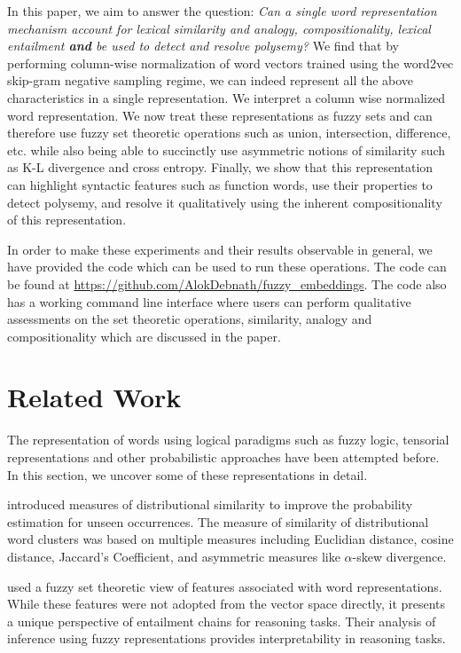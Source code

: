 \documentclass[11pt]{book}
\newcommand{\citet}[1]{\cite{#1}}
\begin{document}
In this paper, we aim to answer the question: \textit{Can a single word
representation mechanism account for lexical similarity and analogy,
compositionality, lexical entailment \textbf{and} be used to detect and resolve
polysemy?} We find that by performing column-wise normalization of word vectors
trained using the word2vec skip-gram negative sampling regime, we can indeed
represent all the above characteristics in a single representation. We
interpret a column wise normalized word representation. We now treat these
representations as fuzzy sets and can therefore use fuzzy set theoretic
operations such as union, intersection, difference, etc. while also being able
to succinctly use asymmetric notions of similarity such as K-L divergence and
cross entropy. Finally, we show that this representation can highlight
syntactic features such as function words, use their properties to detect
polysemy, and resolve it qualitatively using the inherent compositionality of
this representation.

In order to make these experiments and their results observable in general, we
have provided the code which can be used to run these operations. The code can
be found at \url{https://github.com/AlokDebnath/fuzzy_embeddings}. The code
also has a working command line interface where users can perform qualitative
assessments on the set theoretic operations, similarity, analogy and
compositionality which are discussed in the paper.

\section{Related Work} \label{sec: related}

The representation of words using logical paradigms such as fuzzy logic,
tensorial representations and other probabilistic approaches have been
attempted before. In this section, we uncover some of these representations in
detail.

\citet{lee1999measures} introduced measures of distributional similarity to
improve the probability estimation for unseen occurrences. The measure of
similarity of distributional word clusters was based on multiple measures
including Euclidian distance, cosine distance, Jaccard's Coefficient, and
asymmetric measures like $\alpha$-skew divergence.

\citet{bergmair2011monte} used a fuzzy set theoretic view of features
associated with word representations. While these features were not adopted
from the vector space directly, it presents a unique perspective of entailment
chains for reasoning tasks. Their analysis of inference using fuzzy
representations provides interpretability in reasoning tasks.
\end{document}

